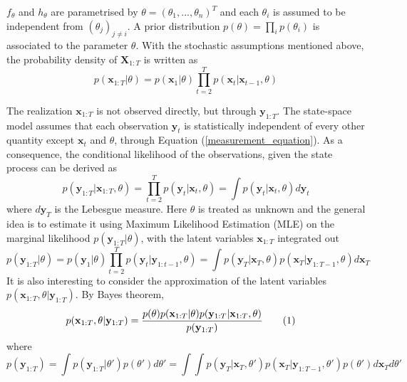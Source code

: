 \documentclass[11pt,a4,twosided,singlespacing,titlepagenumber=on]{scrreprt}
\numberwithin{equation}{chapter} %
\theoremstyle{remark}
\newcommand{\matr}[1]{\mathbf{#1}}
\newcommand\numberthis{\addtocounter{equation}{1}\tag{\theequation}}
\begin{document}
$f_\theta$ and $h_\theta$ are parametrised by $\theta = (\theta_1,...,\theta_n)^T$ and each $\theta_i$ is assumed to be independent from $(\theta_j)_{j \neq i}$. A prior distribution $p(\theta) = \prod_i p(\theta_i)$ is associated to the parameter $\theta$. With the stochastic assumptions mentioned above, the probability density of $\matr{X}_{1:T}$ is written as
\begin{equation}
p(\matr{x}_{1:T} | \theta) = p(\matr{x}_1|\theta) \prod_{t=2}^T p(\matr{x}_t|\matr{x}_{t-1}, \theta) 
\end{equation}

The realization $\matr{x}_{1:T}$ is not observed directly, but through $\matr{y}_{1:T}$. The state-space model assumes that each observation $\matr{y}_t$ is statistically independent of every other quantity except $\matr{x}_t$ and $\theta$, through Equation (\ref{measurement_equation}). As a consequence, the conditional likelihood of the observations, given the state process can be derived as
\begin{equation}
p(\matr{y}_{1:T} | \matr{x}_{1:T}, \theta) = \prod_{t=2}^T p(\matr{y}_t | \matr{x}_t, \theta) = \int p(\matr{y}_t|\matr{x}_t, \theta) d\matr{y}_t
\end{equation}
where $d \matr{y}_T$ is the Lebesgue measure.
Here $\theta$ is treated as unknown and the general idea is to estimate it using Maximum Likelihood Estimation (MLE) on the marginal likelihood $p(\matr{y}_{1:T}|\theta)$, with the latent variables $\matr{x}_{1:T}$ integrated out
\begin{equation}
p(\matr{y}_{1:T} | \theta) = p(\matr{y}_1 |\theta) \prod_{t=2}^T p(\matr{y}_t | \matr{y}_{1:t-1}, \theta) = \int p(\matr{y}_T|\matr{x}_T, \theta) p(\matr{x}_T|\matr{y}_{1:T-1}, \theta) d \matr{x}_T\label{intractable_ssm_2}
\end{equation}
It is also interesting to consider the approximation of the latent variables $p(\matr{x}_{1:T}, \theta | \matr{y}_{1:T})$. By Bayes theorem,
\begin{align*}
p(\matr{x}_{1:T}, \theta | \matr{y}_{1:T}) &= \frac{ p(\theta)p(\matr{x}_{1:T}|\theta)p(\matr{y}_{1:T}|\matr{x}_{1:T}, \theta) }{p(\matr{y}_{1:T})}\numberthis \label{intractable_ssm}
\end{align*}
where
\begin{equation}
p(\matr{y}_{1:T}) = \int p(\matr{y}_{1:T}|\theta')p(\theta') d\theta' = \int \int p(\matr{y}_T|\matr{x}_T, \theta') p(\matr{x}_T|\matr{y}_{1:T-1}, \theta') p(\theta') d \matr{x}_T d\theta'
\end{equation}
\end{document}
